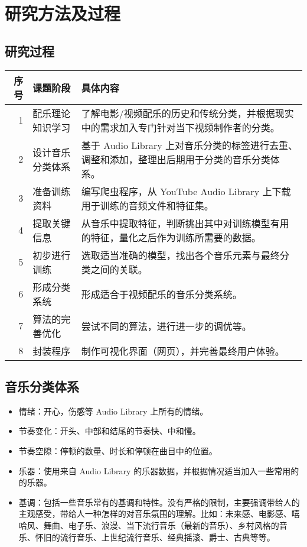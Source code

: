 \documentclass[a4paper,utf8,10pt]{article}
\newcommand{\sept}{\setlength\itemsep{-4pt}}
\begin{document}
\section{研究方法及过程}

\subsection{研究过程}

\noindent\begin{tabular}{ r | l | p{13.5cm} }
\hline
序号 & 课题阶段         & 具体内容                                                                                     \\ \hline
   1 & 配乐理论知识学习 & 了解电影/视频配乐的历史和传统分类，并根据现实中的需求加入专门针对当下视频制作者的分类。      \\ \hline
   2 & 设计音乐分类体系 & 基于 Audio Library 上对音乐分类的标签进行去重、调整和添加，整理出后期用于分类的音乐分类体系。\\ \hline
   3 & 准备训练资料     & 编写爬虫程序，从 YouTube Audio Library 上下载用于训练的音频文件和特征集。                    \\ \hline
   4 & 提取关键信息     & 从音乐中提取特征，判断挑出其中对训练模型有用的特征，量化之后作为训练所需要的数据。           \\ \hline
   5 & 初步进行训练     & 选取适当准确的模型，找出各个音乐元素与最终分类之间的关联。                                   \\ \hline
   6 & 形成分类系统     & 形成适合于视频配乐的音乐分类系统。                                                           \\ \hline
   7 & 算法的完善优化   & 尝试不同的算法，进行进一步的调优等。                                                         \\ \hline
   8 & 封装程序         & 制作可视化界面（网页），并完善最终用户体验。                                                 \\ \hline
\end{tabular}

\subsection{音乐分类体系}

\begin{itemize}
  \sept
  \item 情绪：开心，伤感等 Audio Library 上所有的情绪。
  \item 节奏变化：开头、中部和结尾的节奏快、中和慢。
  \item 节奏空隙：停顿的数量、时长和停顿在曲目中的位置。
  \item 乐器：使用来自 Audio Library 的乐器数据，并根据情况适当加入一些常用的的乐器。
  \item 基调：包括一些音乐常有的基调和特性。没有严格的限制，主要强调带给人的主观感受，带给人一种怎样的对音乐氛围的理解。比如：未来感、电影感、嘻哈风、舞曲、电子乐、浪漫、当下流行音乐（最新的音乐）、乡村风格的音乐、怀旧的流行音乐、上世纪流行音乐、经典摇滚、爵士、古典等等。
\end{itemize}
\end{document}
